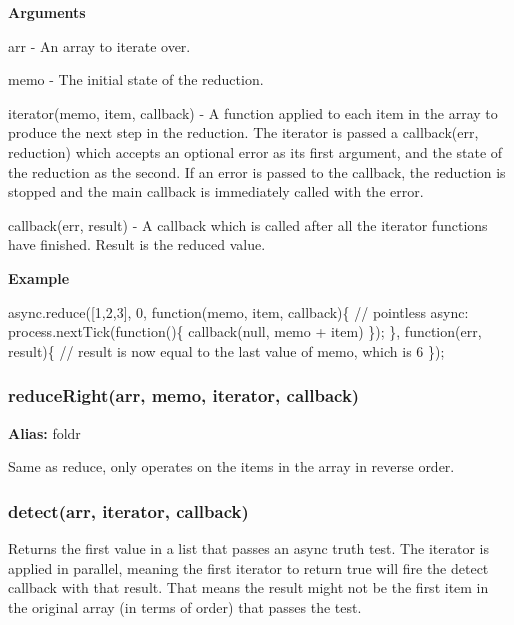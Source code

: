 {\bfseries Arguments}


\begin{DoxyItemize}
\item arr -\/ An array to iterate over.
\item memo -\/ The initial state of the reduction.
\item iterator(memo, item, callback) -\/ A function applied to each item in the array to produce the next step in the reduction. The iterator is passed a callback(err, reduction) which accepts an optional error as its first argument, and the state of the reduction as the second. If an error is passed to the callback, the reduction is stopped and the main callback is immediately called with the error.
\item callback(err, result) -\/ A callback which is called after all the iterator functions have finished. Result is the reduced value.
\end{DoxyItemize}

{\bfseries Example}


\begin{DoxyCode}
async.reduce([1,2,3], 0, function(memo, item, callback)\{
    // pointless async:
    process.nextTick(function()\{
        callback(null, memo + item)
    \});
\}, function(err, result)\{
    // result is now equal to the last value of memo, which is 6
\});
\end{DoxyCode}
 



\label{_reduceRight}%
 \subsubsection*{reduce\+Right(arr, memo, iterator, callback)}

{\bfseries Alias\+:} foldr

Same as reduce, only operates on the items in the array in reverse order.





\label{_detect}%
 \subsubsection*{detect(arr, iterator, callback)}

Returns the first value in a list that passes an async truth test. The iterator is applied in parallel, meaning the first iterator to return true will fire the detect callback with that result. That means the result might not be the first item in the original array (in terms of order) that passes the test.

